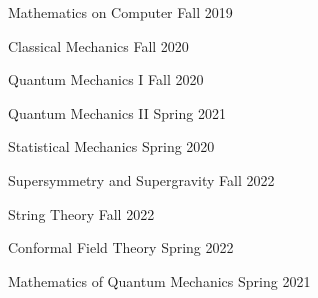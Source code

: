 \begin{multicols}{2}
\begin{cvcourseworks}
  \cvcoursework
    {Mathematics on Computer} %
    {} %
    {} %
    {Fall 2019} %

  \cvcoursework
    {Classical Mechanics} %
    {} %
    {} %
    {Fall 2020} %

  \cvcoursework
    {Quantum Mechanics I} %
    {} %
    {} %
    {Fall 2020} %

  \cvcoursework
    {Quantum Mechanics II} %
    {} %
    {} %
    {Spring 2021} %

  \cvcoursework
    {Statistical Mechanics} %
    {} %
    {} %
    {Spring 2020} %


\end{cvcourseworks}

\vspace{3ex}


\begin{cvcourseworks}

    \cvcoursework
      {Supersymmetry and Supergravity} %
      {} %
      {} %
      {Fall 2022} %
  
    \cvcoursework
      {String Theory} %
      {} %
      {} %
      {Fall 2022} %
  
    \cvcoursework
      {Conformal Field Theory} %
      {} %
      {} %
      {Spring 2022} %
  
    \cvcoursework
      {Mathematics of Quantum Mechanics} %
      {} %
      {} %
      {Spring 2021} %
  

\end{cvcourseworks}
\end{multicols}
